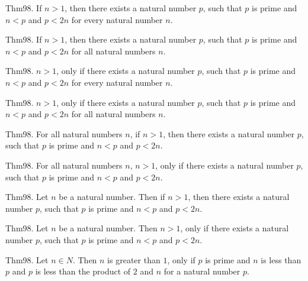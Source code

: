 \documentclass{article}
\begin{document}
Thm98. If $n > 1$, then there exists a natural number $p$, such that $p$ is prime and $n < p$ and $p < 2 n$ for every natural number $n$.

Thm98. If $n > 1$, then there exists a natural number $p$, such that $p$ is prime and $n < p$ and $p < 2 n$ for all natural numbers $n$.

Thm98. $n > 1$, only if there exists a natural number $p$, such that $p$ is prime and $n < p$ and $p < 2 n$ for every natural number $n$.

Thm98. $n > 1$, only if there exists a natural number $p$, such that $p$ is prime and $n < p$ and $p < 2 n$ for all natural numbers $n$.

Thm98. For all natural numbers $n$, if $n > 1$, then there exists a natural number $p$, such that $p$ is prime and $n < p$ and $p < 2 n$.

Thm98. For all natural numbers $n$, $n > 1$, only if there exists a natural number $p$, such that $p$ is prime and $n < p$ and $p < 2 n$.

Thm98. Let $n$ be a natural number. Then if $n > 1$, then there exists a natural number $p$, such that $p$ is prime and $n < p$ and $p < 2 n$.

Thm98. Let $n$ be a natural number. Then $n > 1$, only if there exists a natural number $p$, such that $p$ is prime and $n < p$ and $p < 2 n$.

Thm98. Let $n \in N$. Then $n$ is greater than $1$, only if $p$ is prime and $n$ is less than $p$ and $p$ is less than the product of $2$ and $n$ for a natural number $p$.
\end{document}
